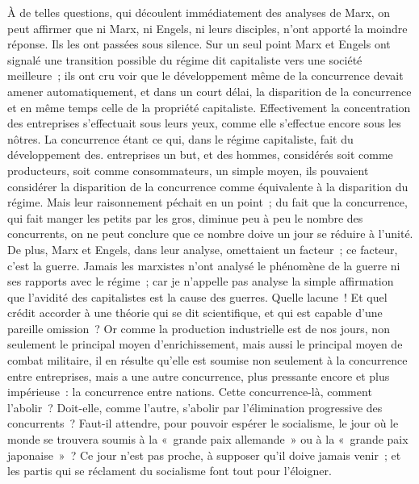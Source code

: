 \documentclass[french,twoside]{book} %
\begin{document}
À de telles questions, qui découlent immédiatement des analyses de Marx, on peut affirmer que ni Marx, ni Engels, ni leurs disciples, n'ont apporté la moindre réponse. Ils les ont passées sous silence. Sur un seul point Marx et Engels ont signalé une transition possible du régime dit capitaliste vers une société meilleure ; ils ont cru voir que le développement même de la concurrence devait amener automatiquement, et dans un court délai, la disparition de la concurrence et en même temps celle de la propriété capitaliste. Effectivement la concentration des entreprises s'effectuait sous leurs yeux, comme elle s'effectue encore sous les nôtres. La concurrence étant ce qui, dans le régime capitaliste, fait du développement des. entreprises un but, et des hommes, considérés soit comme producteurs, soit comme consommateurs, un simple moyen, ils pouvaient considérer la disparition de la concurrence comme équivalente à la disparition du régime. Mais leur raisonnement péchait en un point ; du fait que la concurrence, qui fait manger les petits par les gros, diminue peu à peu le nombre des concurrents, on ne peut conclure que ce nombre doive un jour se réduire à l'unité. De plus, Marx et Engels, dans leur analyse, omettaient un facteur ; ce facteur, c'est la guerre. Jamais les marxistes n'ont analysé le phénomène de la guerre ni ses rapports avec le régime ; car je n'appelle pas analyse la simple affirmation que l'avidité des capitalistes est la cause des guerres. Quelle lacune ! Et quel crédit accorder à une théorie qui se dit scientifique, et qui est capable d'une pareille omission ? Or comme la production industrielle est de nos jours, non seulement le principal moyen d'enrichissement, mais aussi le principal moyen de combat militaire, il en résulte qu'elle est soumise non seulement à la concurrence entre entreprises, mais a une autre concurrence, plus pressante encore et plus impérieuse : la concurrence entre nations. Cette concurrence-là, comment l'abolir ? Doit-elle, comme l'autre, s'abolir par l'élimination progressive des concurrents ? Faut-il attendre, pour pouvoir espérer le socialisme, le jour où le monde se trouvera soumis à la « grande paix allemande » ou à la « grande paix japonaise » ? Ce jour n'est pas proche, à supposer qu'il doive jamais venir ; et les partis qui se réclament du socialisme font tout pour l'éloigner.\par
\end{document}
